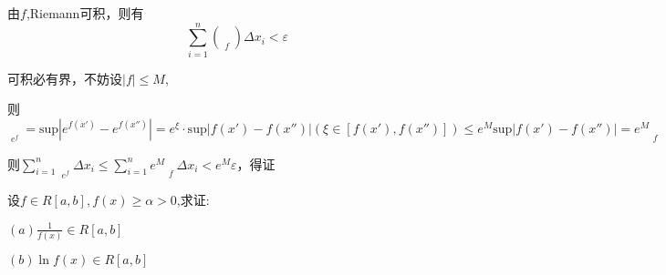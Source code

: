 \documentclass[lang=cn,10pt]{elegantbook}
\begin{document}
\begin{solution}
	
	由$f$,Riemann可积，则有
	\begin{equation*}
		\sum_{i=1}^n{\left( \mathop {w_i} \limits_{f} \right) \varDelta x_i<\varepsilon}
	\end{equation*}
	
	可积必有界，不妨设$|f|\le M$,
	
	则$\mathop {\omega _i} \limits_{e^f}=\mathrm{sup}|e^{f\left( x\prime \right)}-e^{f\left( x'' \right)}|=e^{\xi}\cdot \mathrm{sup}|f\left( x\prime \right) -f\left( x'' \right) |\left( \xi \in \left[ f\left( x\prime \right) ,f\left( x'' \right) \right] \right) \le e^M\mathrm{sup}|f\left( x\prime \right) -f\left( x'' \right) |=e^M\mathop {\omega _i} \limits_{f}
	$
	
	则$\sum_{i=1}^n{\mathop {\omega _i} \limits_{e^f}\varDelta x_i}\le \sum_{i=1}^n{e^M\mathop {\omega _i} \limits_{f}\varDelta x_i<}e^M\varepsilon 
	$，得证
\end{solution}
\begin{example}
	设$f\in R[a,b],f(x)\ge \alpha >0$,求证:
	
	$(a)\frac{1}{f(x)}\in R[a,b]$
	
	$(b)$$\ln f(x) \in R[a,b]$
\end{example}
\end{document}
